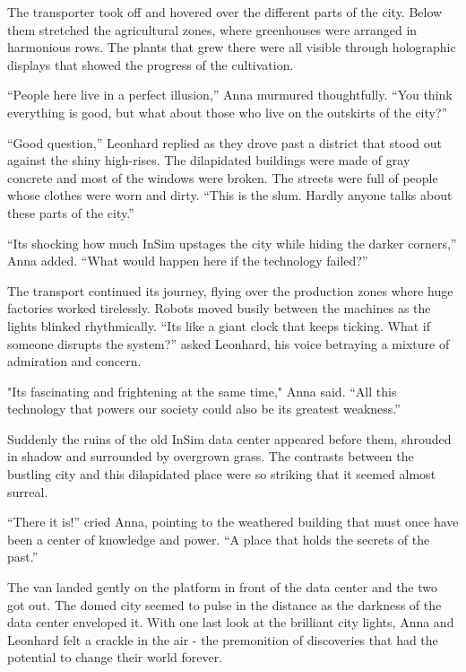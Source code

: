 \documentclass[
]{article}
\begin{document}
The transporter took off and hovered over the different parts of the
city. Below them stretched the agricultural zones, where greenhouses
were arranged in harmonious rows. The plants that grew there were all
visible through holographic displays that showed the progress of the
cultivation.

``People here live in a perfect illusion,'' Anna murmured thoughtfully.
``You think everything is good, but what about those who live on the
outskirts of the city?''

``Good question,'' Leonhard replied as they drove past a district that
stood out against the shiny high-rises. The dilapidated buildings were
made of gray concrete and most of the windows were broken. The streets
were full of people whose clothes were worn and dirty. ``This is the
slum. Hardly anyone talks about these parts of the city.''

``It\textquotesingle s shocking how much InSim upstages the city while
hiding the darker corners,'' Anna added. ``What would happen here if the
technology failed?''

The transport continued its journey, flying over the production zones
where huge factories worked tirelessly. Robots moved busily between the
machines as the lights blinked rhythmically. ``It\textquotesingle s like
a giant clock that keeps ticking. What if someone disrupts the system?''
asked Leonhard, his voice betraying a mixture of admiration and concern.

"It\textquotesingle s fascinating and frightening at the same time,"
Anna said. ``All this technology that powers our society could also be
its greatest weakness.''

Suddenly the ruins of the old InSim data center appeared before them,
shrouded in shadow and surrounded by overgrown grass. The contrasts
between the bustling city and this dilapidated place were so striking
that it seemed almost surreal.

``There it is!'' cried Anna, pointing to the weathered building that
must once have been a center of knowledge and power. ``A place that
holds the secrets of the past.''

The van landed gently on the platform in front of the data center and
the two got out. The domed city seemed to pulse in the distance as the
darkness of the data center enveloped it. With one last look at the
brilliant city lights, Anna and Leonhard felt a crackle in the air - the
premonition of discoveries that had the potential to change their world
forever.
\end{document}
